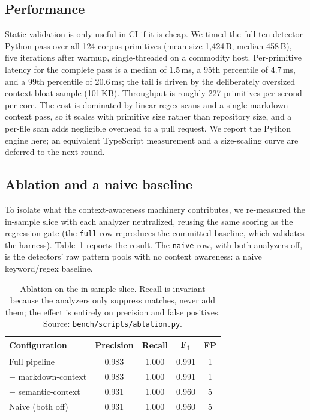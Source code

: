 \subsection{Performance}
\label{subsec:eval-perf}

Static validation is only useful in CI if it is cheap. We timed the full
ten-detector Python pass over all 124 corpus primitives (mean size
1{,}424\,B, median 458\,B), five iterations after warmup, single-threaded
on a commodity host. Per-primitive latency for the complete pass is a
median of 1.5\,ms, a 95th percentile of 4.7\,ms, and a 99th percentile of
20.6\,ms; the tail is driven by the deliberately oversized
context-bloat sample (101\,KB). Throughput is roughly 227 primitives per
second per core. The cost is dominated by linear regex scans and a
single markdown-context pass, so it scales with primitive size rather
than repository size, and a per-file scan adds negligible overhead to a
pull request. We report the Python engine here; an equivalent TypeScript
measurement and a size-scaling curve are deferred to the next round.

\subsection{Ablation and a naive baseline}
\label{subsec:eval-ablation}

To isolate what the context-awareness machinery contributes, we
re-measured the in-sample slice with each analyzer neutralized, reusing
the same scoring as the regression gate (the \texttt{full} row
reproduces the committed baseline, which validates the harness).
Table~\ref{tab:ablation} reports the result. The \texttt{naive} row, with
both analyzers off, is the detectors' raw pattern pools with no context
awareness: a naive keyword/regex baseline.

\begin{table}[t]
\centering
\caption{Ablation on the in-sample slice. Recall is invariant because
the analyzers only suppress matches, never add them; the effect is
entirely on precision and false positives. Source:
\texttt{bench/scripts/ablation.py}.}
\label{tab:ablation}
\footnotesize
\begin{tabular}{@{}l c c c c@{}}
\toprule
Configuration & Precision & Recall & F\textsubscript{1} & FP \\
\midrule
Full pipeline          & 0.983 & 1.000 & 0.991 & 1 \\
$-$ markdown-context   & 0.983 & 1.000 & 0.991 & 1 \\
$-$ semantic-context   & 0.931 & 1.000 & 0.960 & 5 \\
Naive (both off)       & 0.931 & 1.000 & 0.960 & 5 \\
\bottomrule
\end{tabular}
\end{table}

